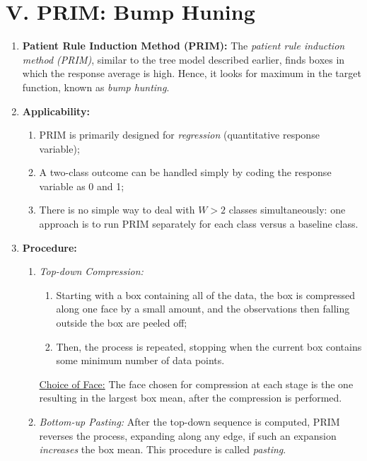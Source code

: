\documentclass[12pt]{article}
\begin{document}
\section*{V. PRIM: Bump Huning}

\begin{enumerate}[label=\textbf{\arabic*.}]

	\item \textbf{Patient Rule Induction Method (PRIM):} The \textit{patient rule induction method (PRIM)}, similar to the tree model described earlier, finds boxes in which the response average is high. Hence, it looks for maximum in the target function, known as \emph{bump hunting}. 
	
	\item \textbf{Applicability:} 
	\begin{enumerate}
		\item PRIM is primarily designed for \emph{regression} (quantitative response variable); 
		\item A two-class outcome can be handled simply by coding the response variable as 0 and 1; 
		\item There is no simple way to deal with $W > 2$ classes simultaneously: one approach is to run PRIM separately for each class versus a baseline class. 
	\end{enumerate}
	
	\item \textbf{Procedure:} 
	\begin{enumerate}
		\item \textit{Top-down Compression:} 
		\begin{enumerate}
			\item Starting with a box containing all of the data, the box is compressed along one face by a small amount, and the observations then falling outside the box are peeled off; 
			\item Then, the process is repeated, stopping when the current box contains some minimum number of data points. 
		\end{enumerate}
		
		\underline{Choice of Face:} The face chosen for compression at each stage is the one resulting in the largest box mean, after the compression is performed. 
		
		\item \textit{Bottom-up Pasting:} After the top-down sequence is computed, PRIM reverses the process, expanding along any edge, if such an expansion \emph{increases} the box mean. This procedure is called \emph{pasting}. 
		

\end{enumerate}
\end{enumerate}
\end{document}

